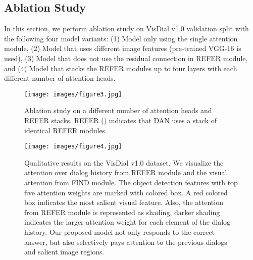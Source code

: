 \documentclass[11pt,a4paper]{article}
\begin{document}
\subsection{Ablation Study}
\label{sec:abl}
In this section, we perform ablation study on VisDial v1.0 validation split with the following four model variants: (1) Model only using the single attention module, (2) Model that uses different image features (pre-trained VGG-16 is used), (3) Model that does not use the residual connection in REFER module, and (4) Model that stacks the REFER modules up to four layers with each different number of attention heads.
\begin{table}
\centering
{}
\caption{Ablation studies on VisDial v1.0 validation split. 
Res and RPN denote the residual connection and the region proposal networks, respectively.}
\label{tab:t5}
\end{table}

\begin{figure}[ht]
\label{figure:architecture4}
\centering
\texttt{[image: images/figure3.jpg]}
\caption{Ablation study on a different number of attention heads and REFER stacks. REFER () indicates that DAN uses a stack of  identical REFER modules.}
\end{figure}

\begin{figure*}[ht!]
\label{figure:architecture3}
\centering
\texttt{[image: images/figure4.jpg]}
\caption{Qualitative results on the VisDial v1.0 dataset. We visualize the attention over dialog history from REFER module and the visual attention from FIND module. The object detection features with top five attention weights are marked with colored box. A red colored box indicates the most salient visual feature.  Also, the attention from REFER module is represented as shading, darker shading indicates the larger attention weight for each element of the dialog history. Our proposed model not only responds to the correct answer, but also selectively pays attention to the previous dialogs and salient image regions.}
\end{figure*}
\end{document}
